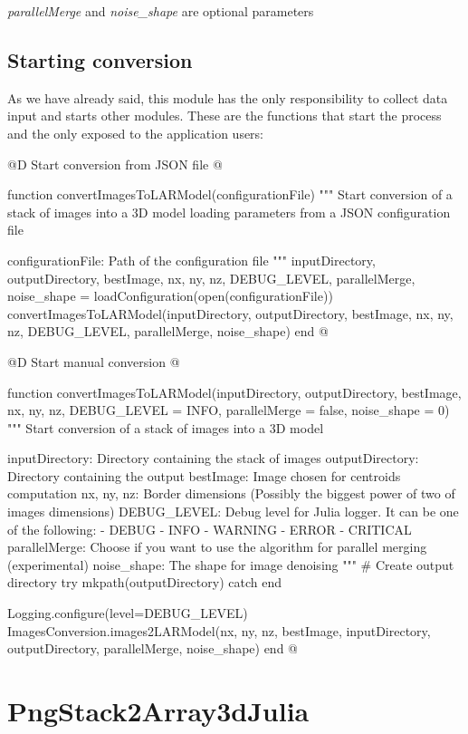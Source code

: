 \documentclass[11pt,oneside]{article}	%
\begin{document}
\textit{parallelMerge} and \textit{noise\_shape} are optional parameters

\subsection{Starting conversion}\label{sec:input}

As we have already said, this module has the only responsibility to collect data input and starts other modules. These are the functions that start the process and the only exposed to the application users:

@D Start conversion from JSON file
@{function convertImagesToLARModel(configurationFile)
  """
  Start conversion of a stack of images into a 3D model
  loading parameters from a JSON configuration file

  configurationFile: Path of the configuration file
  """
  inputDirectory, outputDirectory, bestImage, nx, ny, nz,
      DEBUG_LEVEL, parallelMerge, noise_shape = loadConfiguration(open(configurationFile))
  convertImagesToLARModel(inputDirectory, outputDirectory, bestImage,
			nx, ny, nz, DEBUG_LEVEL, parallelMerge, noise_shape)
end
@}

@D Start manual conversion
@{function convertImagesToLARModel(inputDirectory, outputDirectory, bestImage,
                                 nx, ny, nz, DEBUG_LEVEL = INFO,
                                 parallelMerge = false, noise_shape = 0)
  """
  Start conversion of a stack of images into a 3D model

  inputDirectory: Directory containing the stack of images
  outputDirectory: Directory containing the output
  bestImage: Image chosen for centroids computation
  nx, ny, nz: Border dimensions (Possibly the biggest power of two of images dimensions)
  DEBUG_LEVEL: Debug level for Julia logger. It can be one of the following:
    - DEBUG
    - INFO
    - WARNING
    - ERROR
    - CRITICAL
  parallelMerge: Choose if you want to use the algorithm
  for parallel merging (experimental)
  noise_shape: The shape for image denoising
  """
  # Create output directory
  try
    mkpath(outputDirectory)
  catch
  end

  Logging.configure(level=DEBUG_LEVEL)
  ImagesConversion.images2LARModel(nx, ny, nz, bestImage,
	  inputDirectory, outputDirectory, parallelMerge, noise_shape)
end
@}

\section{PngStack2Array3dJulia}\label{sec:PngStack2Array3dJulia}
\end{document}
